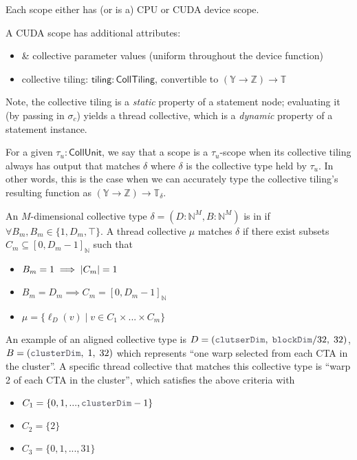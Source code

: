 Each scope either has (or is a) CPU or CUDA device scope.

\filbreak
A CUDA scope has additional attributes:
\begin{itemize}
  \item {} \&  collective parameter values (uniform throughout the device function)
  \item collective tiling: $\mathsf{tiling}: \mathsf{CollTiling}$, convertible to $(\mathbb{Y} \to \mathbb{Z}) \to \mathbb{T}$
\end{itemize}

\filbreak
Note, the collective tiling is a \textit{static} property of a statement node; evaluating it (by passing in $\sigma_c$) yields a thread collective, which is a \textit{dynamic} property of a statement instance.

\filbreak
For a given $\tau_u : \mathsf{CollUnit}$, we say that a scope is a $\tau_u$-scope when its collective tiling always has output that matches $\delta$ where $\delta$ is the collective type held by $\tau_u$.
In other words, this is the case when we can accurately type the collective tiling's resulting function as $(\mathbb{Y} \to \mathbb{Z}) \to \mathbb{T}_\delta$.

\filbreak
{}

An $M$-dimensional collective type $\delta = (D: \mathbb{N}^M, B: \mathbb{N}^M)$ is in  if $\forall B_m, B_m \in \{1, D_m, \top\}$.
A thread collective $\mu$ matches $\delta$ if there exist subsets $C_m \subseteq [0, D_m - 1]_\mathbb{N}$ such that
\begin{itemize}
  \item $B_m = 1 \implies \left \vert C_m \right\vert = 1$
  \item $B_m = D_m \implies C_m = [0, D_m-1]_\mathbb{N}$
  \item $\mu = \{ \ell_D(v) \mid v \in C_1 \times ... \times C_m \}$
\end{itemize}

An example of an aligned collective type is $D = (\lighttt{clutserDim},\;\lighttt{blockDim} / 32,\;32)$, $B = (\lighttt{clusterDim},\;1,\;32)$ which represents ``one warp selected from each CTA in the cluster''.
A specific thread collective that matches this collective type is ``warp 2 of each CTA in the cluster'', which satisfies the above criteria with
\begin{itemize}
  \item $C_1 = \{ 0, 1, ..., \lighttt{clusterDim}-1 \}$
  \item $C_2 = \{ 2 \}$
  \item $C_3 = \{ 0, 1, ..., 31 \}$
\end{itemize}

